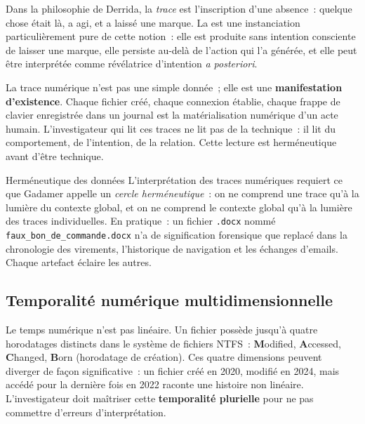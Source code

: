 Dans la philosophie de Derrida, la \textit{trace} est l'inscription d'une
absence~: quelque chose était là, a agi, et a laissé une marque. La
 est une instanciation
particulièrement pure de cette notion~: elle est produite sans intention
consciente de laisser une marque, elle persiste au-delà de l'action qui
l'a générée, et elle peut être interprétée comme révélatrice d'intention
\emph{a posteriori}.

\medskip

La trace numérique n'est pas une simple donnée~; elle est une
\textbf{manifestation d'existence}. Chaque fichier créé, chaque connexion
établie, chaque frappe de clavier enregistrée dans un journal est la
matérialisation numérique d'un acte humain. L'investigateur qui lit ces
traces ne lit pas de la technique~: il lit du comportement, de l'intention,
de la relation. Cette lecture est herméneutique avant d'être technique.

\begin{boiteRemarque}{Herméneutique des données}
L'interprétation des traces numériques requiert ce que Gadamer appelle
un \textit{cercle herméneutique}~: on ne comprend une trace qu'à la lumière
du contexte global, et on ne comprend le contexte global qu'à la lumière
des traces individuelles. En pratique~: un fichier \texttt{.docx} nommé
\texttt{faux\_bon\_de\_commande.docx} n'a de signification forensique que
replacé dans la chronologie des virements, l'historique de navigation et
les échanges d'emails. Chaque artefact éclaire les autres.
\end{boiteRemarque}

\subsection{Temporalité numérique multidimensionnelle}

Le temps numérique n'est pas linéaire. Un fichier possède jusqu'à quatre
horodatages distincts dans le système de fichiers NTFS~:
\textbf{M}odified, \textbf{A}ccessed, \textbf{C}hanged, \textbf{B}orn
(horodatage de création). Ces quatre dimensions peuvent diverger de
façon significative~: un fichier créé en 2020, modifié en 2024, mais
accédé pour la dernière fois en 2022 raconte une histoire non linéaire.
L'investigateur doit maîtriser cette \textbf{temporalité
plurielle} pour ne pas
commettre d'erreurs d'interprétation.

